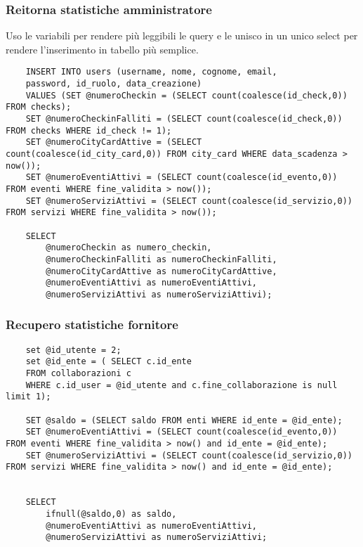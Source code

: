 \subsubsection{Reitorna statistiche amministratore}
Uso le variabili per rendere più leggibili le query e le unisco in un unico select per rendere l'inserimento in tabello più semplice. 
\begin{lstlisting}
    INSERT INTO users (username, nome, cognome, email,
    password, id_ruolo, data_creazione) 
    VALUES (SET @numeroCheckin = (SELECT count(coalesce(id_check,0)) FROM checks);
    SET @numeroCheckinFalliti = (SELECT count(coalesce(id_check,0)) FROM checks WHERE id_check != 1);
    SET @numeroCityCardAttive = (SELECT count(coalesce(id_city_card,0)) FROM city_card WHERE data_scadenza > now());
    SET @numeroEventiAttivi = (SELECT count(coalesce(id_evento,0)) FROM eventi WHERE fine_validita > now());
    SET @numeroServiziAttivi = (SELECT count(coalesce(id_servizio,0)) FROM servizi WHERE fine_validita > now());

    SELECT 
        @numeroCheckin as numero_checkin,
        @numeroCheckinFalliti as numeroCheckinFalliti,
        @numeroCityCardAttive as numeroCityCardAttive,
        @numeroEventiAttivi as numeroEventiAttivi,
        @numeroServiziAttivi as numeroServiziAttivi);
\end{lstlisting}





\subsubsection{Recupero statistiche fornitore}
\begin{lstlisting}
    set @id_utente = 2;
    set @id_ente = ( SELECT c.id_ente
    FROM collaborazioni c
    WHERE c.id_user = @id_utente and c.fine_collaborazione is null limit 1);
    
    SET @saldo = (SELECT saldo FROM enti WHERE id_ente = @id_ente);
    SET @numeroEventiAttivi = (SELECT count(coalesce(id_evento,0)) FROM eventi WHERE fine_validita > now() and id_ente = @id_ente);
    SET @numeroServiziAttivi = (SELECT count(coalesce(id_servizio,0)) FROM servizi WHERE fine_validita > now() and id_ente = @id_ente);


    SELECT  
        ifnull(@saldo,0) as saldo,
        @numeroEventiAttivi as numeroEventiAttivi,
        @numeroServiziAttivi as numeroServiziAttivi;
\end{lstlisting}




